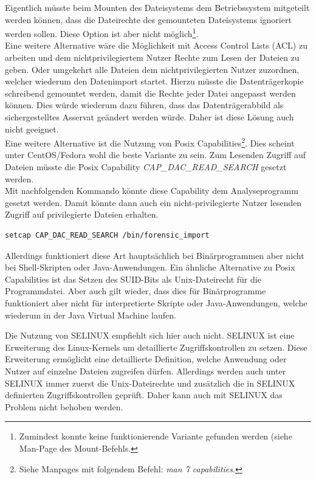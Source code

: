 \noindent
Eigentlich müsste beim Mounten des Dateisystems dem Betriebssystem mitgeteilt werden können, dass die Dateirechte des gemounteten Dateisystems ignoriert werden sollen. Diese Option ist aber nicht möglich\footnote{Zumindest konnte keine funktionierende Variante gefunden werden (siehe Man-Page des Mount-Befehls.}.\\
Eine weitere Alternative wäre die Möglichkeit mit Access Control Lists (ACL) zu arbeiten und dem nichtprivilegiertem Nutzer Rechte zum Lesen der Dateien zu geben. Oder umgekehrt alle Dateien dem nichtprivilegierten Nutzer zuzordnen, welcher wiederum den Datenimport startet.
Hierzu müsste die Datenträgerkopie schreibend gemountet werden, damit die Rechte jeder Datei angepasst werden können. Dies würde wiederum dazu führen, dass das Datenträgerabbild als sichergestelltes Asservat geändert werden würde. 
Daher ist diese Lösung auch nicht geeignet.\\

\noindent
Eine weitere Alternative ist die Nutzung von Posix Capabilities\footnote{Siehe Manpages mit folgendem Befehl: \textit{ man 7 capabilities}.}.
Dies scheint unter CentOS/Fedora wohl die beste Variante zu sein. Zum Lesenden Zugriff auf Dateien müsste die Posix Capability \textit{CAP\_DAC\_READ\_SEARCH} gesetzt werden.\\
Mit nachfolgenden Kommando könnte diese Capability dem Analyseprogramm gesetzt werden.
Damit könnte dann auch ein nicht-privilegierte Nutzer lesenden Zugriff auf privilegierte Dateien erhalten.\\ 

\begin{lstlisting}[label={lst:pos_cap_command},caption= Befehl zum Setzen von Posix Capabilities,captionpos=b,frame=single,style=customshell]
setcap CAP_DAC_READ_SEARCH /bin/forensic_import
\end{lstlisting}

\noindent
Allerdings funktioniert diese Art hauptsächlich bei Binärprogrammen aber nicht bei Shell-Skripten oder Java-Anwendungen. Ein ähnliche Alternative zu Posix Capabilities ist das Setzen des SUID-Bits als Unix-Dateirecht für die Programmdatei. Aber auch gilt wieder, dass dies für Binärprogramme funktioniert aber nicht für interpretierte Skripte oder Java-Anwendungen, welche wiederum in der Java Virtual Machine laufen.

Die Nutzung von SELINUX empfiehlt sich hier auch nicht. SELINUX ist eine Erweiterung des Linux-Kernels um detaillierte Zugriffskontrollen zu setzen. Diese Erweiterung ermöglicht eine detaillierte Definition, welche Anwendung oder Nutzer auf einzelne Dateien zugreifen dürfen. Allerdings werden auch unter SELINUX immer zuerst die Unix-Dateirechte und zusätzlich die in SELINUX definierten Zugriffskontrollen geprüft. Daher kann auch mit SELINUX das Problem nicht behoben werden.\\

